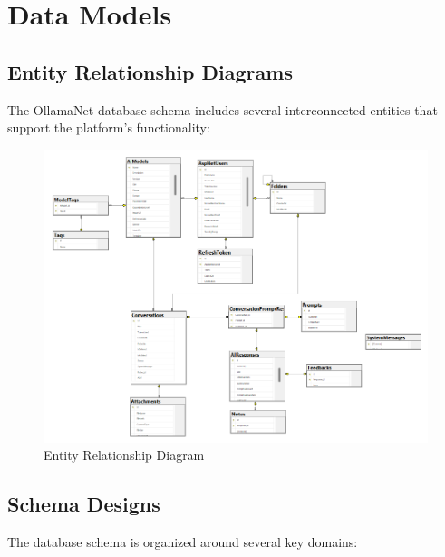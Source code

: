 \section{Data Models}

\subsection{Entity Relationship Diagrams}

The OllamaNet database schema includes several interconnected entities that support the platform's functionality:

\begin{figure}[p]
    \centering
    \includegraphics[width=\textwidth]{./Chapter05/figures/entity_relationship.png}
    \caption{Entity Relationship Diagram}
    \label{fig:entity-relationship}
\end{figure}
\clearpage

\subsection{Schema Designs}

The database schema is organized around several key domains:

